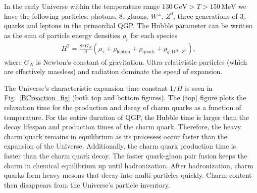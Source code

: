 \documentclass[universe,article,submit,moreauthors,pdftex,a4paper]{Definitions/mdpi}
\newcommand*{\rf}[1]{Fig.~{\ref{#1}}}
\begin{document}
In the early Universe within the temperature range $130\, \mathrm{GeV}>T>150\, \mathrm{MeV}$ we have the following particles: photons, $8_c$-gluons, $W^\pm$, $Z^0$, three generations of $3_c$-quarks and leptons in the primordial QGP. The Hubble parameter can be written as the sum of particle energy densities $\rho_i$ for each species
\begin{align}
H^2=\frac{8\pi G_{N}}{3}\left(\rho_\gamma+\rho_{\mathrm{lepton}}+\rho_{\mathrm{quark}}+\rho_{g,{W^\pm},{Z^0}}\right),
\end{align}
where $G_{N}$ is Newton's constant of gravitation. Ultra-relativistic particles (which are effectively massless) and radiation dominate the speed of expansion.

The Universe's characteristic expansion time constant $1/H$ is seen in \rf{BCreaction_fig} (both top and bottom figures). The (top) figure plots the relaxation time for the production and decay of charm quarks as a function of temperature. For the entire duration of QGP, the Hubble time is larger than the decay lifespan and production times of the charm quark. Therefore, the heavy charm quark remains in equilibrium as its processes occur faster than the expansion of the Universe. Additionally, the charm quark production time is faster than the charm quark decay. The faster quark-gluon pair fusion keeps the charm in chemical equilibrium up until hadronization. After hadronization, charm quarks form heavy mesons that decay into multi-particles quickly. Charm content then disappears from the Universe's particle inventory.
\end{document}
